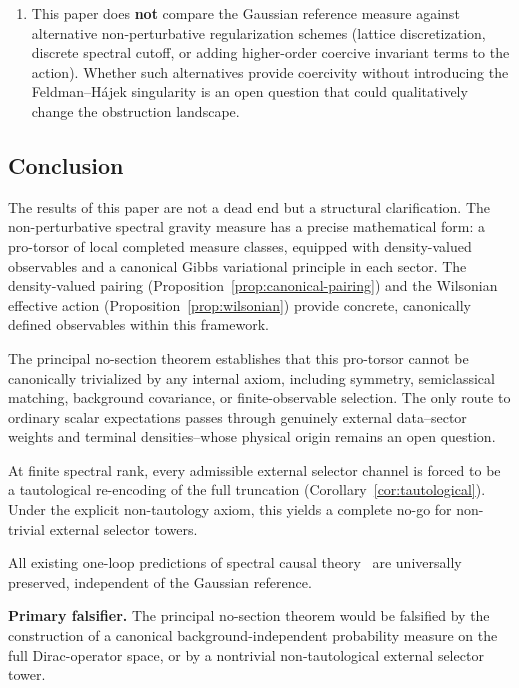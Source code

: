\documentclass[12pt,a4paper]{article}
\theoremstyle{plain}
\theoremstyle{definition}
\theoremstyle{remark}
\begin{document}
\begin{enumerate}[leftmargin=2em]
  \item This paper does \textbf{not} compare the Gaussian reference
    measure against alternative non-perturbative regularization
    schemes (lattice discretization, discrete spectral cutoff, or
    adding higher-order coercive invariant terms to the action).
    Whether such alternatives provide coercivity without introducing
    the Feldman--H\'ajek singularity is an open question that could
    qualitatively change the obstruction landscape.
\end{enumerate}

\subsection{Conclusion}

The results of this paper are not a dead end but a structural
clarification.  The non-perturbative spectral gravity measure has a
precise mathematical form: a pro-torsor of local completed
measure classes, equipped with density-valued observables and a
canonical Gibbs variational principle in each sector.  The
density-valued pairing (Proposition~\ref{prop:canonical-pairing})
and the Wilsonian effective action
(Proposition~\ref{prop:wilsonian}) provide concrete, canonically
defined observables within this framework.

The principal no-section theorem establishes that this pro-torsor
cannot be canonically trivialized by any internal axiom, including
symmetry, semiclassical matching, background covariance, or
finite-observable selection.  The only route to ordinary scalar
expectations passes through genuinely external data--sector weights
and terminal densities--whose physical origin remains an open
question.

At finite spectral rank, every admissible external selector channel
is forced to be a tautological re-encoding of the full truncation
(Corollary~\ref{cor:tautological}).  Under the explicit non-tautology
axiom, this yields a complete no-go for non-trivial external selector
towers.

All existing one-loop predictions of spectral causal
theory~\cite{Alfyorov:2026ff,Alfyorov:2026ss,AlfyorovShnyukov:2026ns,%
Alfyorov:2026fe,Alfyorov:2026ct} are universally preserved,
independent of the Gaussian reference.

\medskip

\noindent\textbf{Primary falsifier.}\quad
The principal no-section theorem would be falsified by the construction
of a canonical background-independent probability measure on the
full Dirac-operator space, or by a nontrivial non-tautological external
selector tower.
\end{document}
